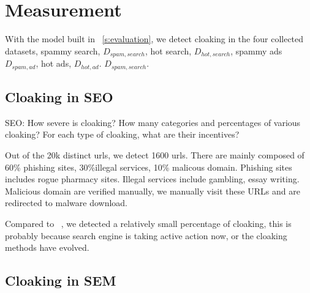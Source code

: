 \section{Measurement}
\label{s:measurement}


With the model built in ~\autoref{s:evaluation}, we detect cloaking in
the four collected datasets, spammy search, $D_{spam, search}$, hot search,
$D_{hot, search}$, spammy ads $D_{spam, ad}$, hot ads, $D_{hot, ad}$. 
$D_{spam, search}$.

\subsection{Cloaking in SEO}

SEO: How severe is cloaking? How many categories and percentages of various
cloaking? For each type of cloaking, what are their incentives?

Out of the 20k distinct urls, we detect 1600 urls. There are mainly composed of
60\% phishing sites, 30\%illegal services, 10\% malicous domain. Phishing sites includes rogue
pharmacy sites. Illegal services include gambling, essay writing. Malicious
domain are verified manually, we manually visit these URLs and are redirected to
malware download.

Compared to  ~\cite{wang2011cloak}, we detected a relatively small percentage of
cloaking, this is probably because search engine is taking active action now, or
the cloaking methods have evolved.

%
%
%






\subsection{Cloaking in SEM}

